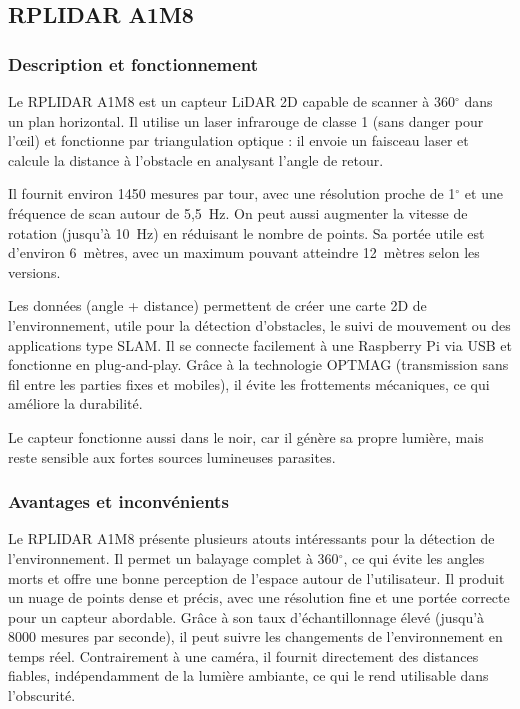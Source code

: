 \subsection{RPLIDAR A1M8}

\vspace{2em}

\subsubsection{Description et fonctionnement}

Le RPLIDAR A1M8 est un capteur LiDAR 2D capable de scanner à 360$^\circ$ dans un plan horizontal. Il utilise un laser infrarouge de classe 1 (sans danger pour l’œil) et fonctionne par triangulation optique : il envoie un faisceau laser et calcule la distance à l’obstacle en analysant l’angle de retour.

\vspace{1em}

Il fournit environ 1450 mesures par tour, avec une résolution proche de 1$^\circ$ et une fréquence de scan autour de 5{,}5~Hz. On peut aussi augmenter la vitesse de rotation (jusqu’à 10~Hz) en réduisant le nombre de points. Sa portée utile est d’environ 6~mètres, avec un maximum pouvant atteindre 12~mètres selon les versions.

\vspace{1em}

Les données (angle + distance) permettent de créer une carte 2D de l’environnement, utile pour la détection d’obstacles, le suivi de mouvement ou des applications type SLAM. Il se connecte facilement à une Raspberry Pi via USB et fonctionne en plug-and-play. Grâce à la technologie OPTMAG (transmission sans fil entre les parties fixes et mobiles), il évite les frottements mécaniques, ce qui améliore la durabilité.

\vspace{1em}

Le capteur fonctionne aussi dans le noir, car il génère sa propre lumière, mais reste sensible aux fortes sources lumineuses parasites.

\vspace{2em}

\subsubsection{Avantages et inconvénients}

Le RPLIDAR A1M8 présente plusieurs atouts intéressants pour la détection de l’environnement. Il permet un balayage complet à 360$^\circ$, ce qui évite les angles morts et offre une bonne perception de l’espace autour de l’utilisateur. Il produit un nuage de points dense et précis, avec une résolution fine et une portée correcte pour un capteur abordable. Grâce à son taux d’échantillonnage élevé (jusqu’à 8000 mesures par seconde), il peut suivre les changements de l’environnement en temps réel. Contrairement à une caméra, il fournit directement des distances fiables, indépendamment de la lumière ambiante, ce qui le rend utilisable dans l’obscurité.

